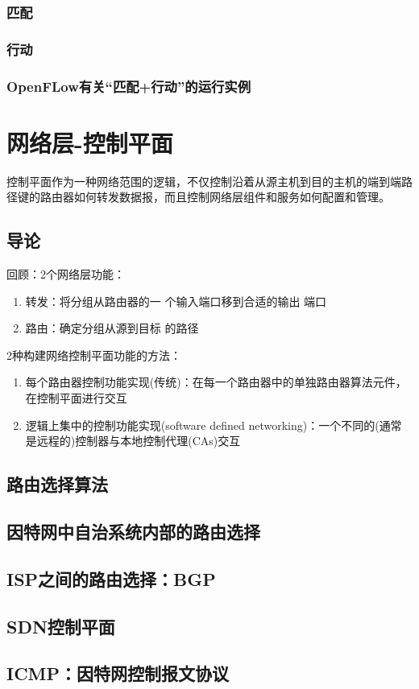 \documentclass[]{report}
\begin{document}
		\subsection{匹配}
		\subsection{行动}
		\subsection{OpenFLow有关“匹配+行动”的运行实例}

	\chapter{网络层-控制平面}
	控制平面作为一种网络范围的逻辑，不仅控制沿着从源主机到目的主机的端到端路径键的路由器如何转发数据报，而且控制网络层组件和服务如何配置和管理。
	\section{导论}
	回顾：2个网络层功能：
	\begin{enumerate}
		\item 转发：将分组从路由器的一 个输入端口移到合适的输出 端口
		\item 路由：确定分组从源到目标 的路径
	\end{enumerate}
	2种构建网络控制平面功能的方法：
	\begin{enumerate}
		\item 每个路由器控制功能实现(传统)：在每一个路由器中的单独路由器算法元件，在控制平面进行交互
		\item 逻辑上集中的控制功能实现(software defined networking)：一个不同的(通常是远程的)控制器与本地控制代理(CAs)交互
	\end{enumerate}
	\section{路由选择算法}
	\section{因特网中自治系统内部的路由选择}
	\section{ISP之间的路由选择：BGP}
	\section{SDN控制平面}
	\section{ICMP：因特网控制报文协议}
\end{document}
